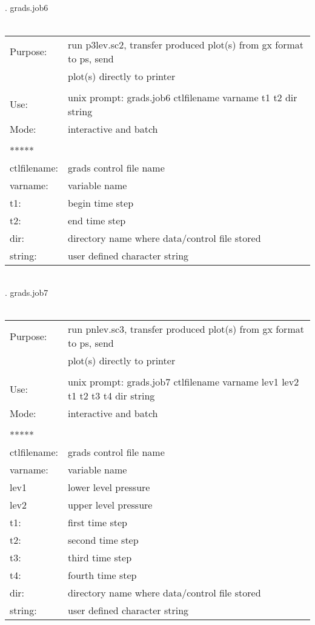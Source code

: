 \\
\\
\\
\\
. grads.job6 \\ \\
\begin{tabular}{ll}
Purpose:     &  run p3lev.sc2, transfer produced plot(s) from gx format to ps, send \\
             &  plot(s) directly to printer  \\
\\
Use:         &  unix prompt: grads.job6 ctlfilename varname t1 t2 dir  string     \\
Mode:        &  interactive and batch        \\ 
\\
*****  \\
ctlfilename: &  grads control file name     \\
varname:     &  variable name     \\
t1:       &  begin time step    \\
t2:       &  end time step    \\
dir:      &  directory name where data/control file stored   \\
string:   &  user defined character string 
\end{tabular}
\\
\newpage 
{}. grads.job7 \\ \\
\begin{tabular}{ll}
Purpose:     &  run pnlev.sc3, transfer produced plot(s) from gx format to ps, send \\
             &  plot(s) directly to printer  \\
\\
Use:         &  unix prompt: grads.job7 ctlfilename varname lev1 lev2 t1 t2 t3 t4 dir string\\
Mode:        &  interactive and batch        \\ 
\\
*****  \\
ctlfilename: &  grads control file name     \\
varname:     &  variable name      \\
lev1      &  lower level pressure  \\
lev2      &  upper level pressure  \\
t1:       &  first time step       \\
t2:       &  second time step      \\
t3:       &  third time step       \\
t4:       &  fourth time step       \\
dir:      &  directory name where data/control file stored  \\ 
string:   &  user defined character string 
\end{tabular}
\\ 


